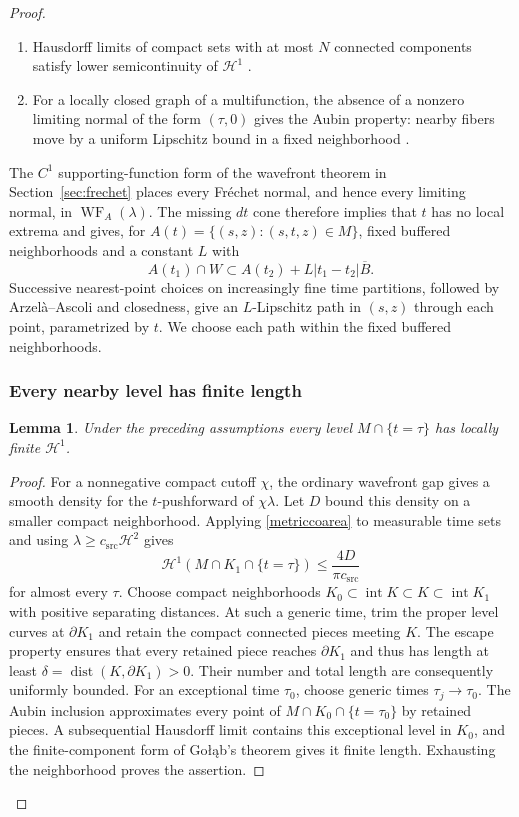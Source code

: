 \documentclass[11pt]{article}
\newtheorem{lemma}[theorem]{Lemma}
\newcommand{\HH}{\mathcal H}
\newcommand{\WF}{\operatorname{WF}_{A}}
\newcommand{\Int}{\operatorname{int}}
\begin{document}
\begin{proof}
\begin{enumerate}
\item Hausdorff limits of compact sets with at most $N$ connected components satisfy lower semicontinuity of $\HH^1$ \cite[Theorem 2.9]{AO}.
\item For a locally closed graph of a multifunction, the absence of a nonzero limiting normal of the form $(\tau,0)$ gives the Aubin property: nearby fibers move by a uniform Lipschitz bound in a fixed neighborhood \cite[Theorem 2.4 and Remark 2.1]{ML}.
\end{enumerate}
The $C^1$ supporting-function form of the wavefront theorem in Section~\ref{sec:frechet} places every Fr\'echet normal, and hence every limiting normal, in $\WF(\lambda)$. The missing $dt$ cone therefore implies that $t$ has no local extrema and gives, for
$A(t)=\{(s,z):(s,t,z)\in M\}$, fixed buffered neighborhoods and a constant $L$ with
\begin{equation}\label{fiberAubin}
 A(t_1)\cap W\subset A(t_2)+L|t_1-t_2|\overline B.
\end{equation}
Successive nearest-point choices on increasingly fine time partitions, followed by Arzel\`a--Ascoli and closedness, give an $L$-Lipschitz path in $(s,z)$ through each point, parametrized by $t$. We choose each path within the fixed buffered neighborhoods.

\subsubsection{Every nearby level has finite length}
\begin{lemma}\label{lem:alllevels}
Under the preceding assumptions every level $M\cap\{t=\tau\}$ has locally finite $\HH^1$.
\end{lemma}
\begin{proof}
For a nonnegative compact cutoff $\chi$, the ordinary wavefront gap gives a smooth density for the $t$-pushforward of $\chi\lambda$. Let $D$ bound this density on a smaller compact neighborhood. Applying \eqref{metriccoarea} to measurable time sets and using $\lambda\ge c_{\mathrm{src}}\HH^2$ gives
\[
 \HH^1(M\cap K_1\cap\{t=\tau\})\le \frac{4D}{\pi c_{\mathrm{src}}}
\]
for almost every $\tau$. Choose compact neighborhoods $K_0\subset\Int K\subset K\subset\Int K_1$ with positive separating distances. At such a generic time, trim the proper level curves at $\partial K_1$ and retain the compact connected pieces meeting $K$. The escape property ensures that every retained piece reaches $\partial K_1$ and thus has length at least $\delta=\operatorname{dist}(K,\partial K_1)>0$. Their number and total length are consequently uniformly bounded. For an exceptional time $\tau_0$, choose generic times $\tau_j\to\tau_0$. The Aubin inclusion approximates every point of $M\cap K_0\cap\{t=\tau_0\}$ by retained pieces. A subsequential Hausdorff limit contains this exceptional level in $K_0$, and the finite-component form of Go\l\k{a}b's theorem gives it finite length. Exhausting the neighborhood proves the assertion.
\end{proof}


\end{proof}
\end{document}

